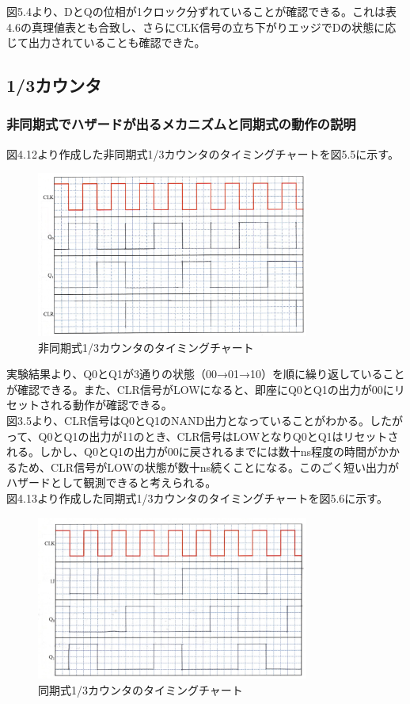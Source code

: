\documentclass{jlreq}
\numberwithin{equation}{section}
\begin{document}
図5.4より、DとQの位相が1クロック分ずれていることが確認できる。これは表4.6の真理値表とも合致し、さらにCLK信号の立ち下がりエッジでDの状態に応じて出力されていることも確認できた。

\subsection{1/3カウンタ}
\subsubsection{非同期式でハザードが出るメカニズムと同期式の動作の説明}

図4.12より作成した非同期式1/3カウンタのタイミングチャートを図5.5に示す。

\begin{figure}[H]
  \centering
  \includegraphics[width=0.8\textwidth]{assets/hidoukichart.png}
  \caption{非同期式1/3カウンタのタイミングチャート}
\end{figure}

実験結果より、Q0とQ1が3通りの状態（00→01→10）を順に繰り返していることが確認できる。また、CLR信号がLOWになると、即座にQ0とQ1の出力が00にリセットされる動作が確認できる。\\

図3.5より、CLR信号はQ0とQ1のNAND出力となっていることがわかる。したがって、Q0とQ1の出力が11のとき、CLR信号はLOWとなりQ0とQ1はリセットされる。しかし、Q0とQ1の出力が00に戻されるまでには数十ns程度の時間がかかるため、CLR信号がLOWの状態が数十ns続くことになる。このごく短い出力がハザードとして観測できると考えられる。\\

図4.13より作成した同期式1/3カウンタのタイミングチャートを図5.6に示す。

\begin{figure}[H]
  \centering
  \includegraphics[width=0.8\textwidth]{assets/doukichart.png}
  \caption{同期式1/3カウンタのタイミングチャート}
\end{figure}
\end{document}
